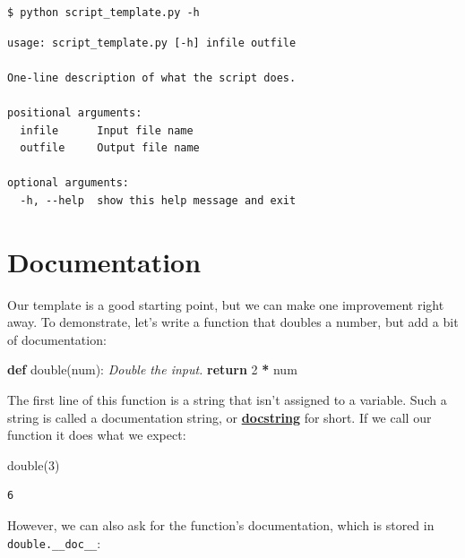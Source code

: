 \documentclass[
]{krantz}
\makeatletter
\newenvironment{Shaded}{\begin{snugshade}}{\end{snugshade}}
\newcommand{\CommentTok}[1]{\textcolor[rgb]{0.56,0.35,0.01}{\textit{#1}}}
\newcommand{\ControlFlowTok}[1]{\textcolor[rgb]{0.13,0.29,0.53}{\textbf{#1}}}
\newcommand{\DecValTok}[1]{\textcolor[rgb]{0.00,0.00,0.81}{#1}}
\newcommand{\KeywordTok}[1]{\textcolor[rgb]{0.13,0.29,0.53}{\textbf{#1}}}
\newcommand{\NormalTok}[1]{#1}
\newcommand{\OperatorTok}[1]{\textcolor[rgb]{0.81,0.36,0.00}{\textbf{#1}}}
\newenvironment{kframe}{%
\medskip{}
\setlength{\fboxsep}{.8em}
 \def\at@end@of@kframe{}%
 \ifinner\ifhmode%
  \def\at@end@of@kframe{\end{minipage}}%
  \begin{minipage}{\columnwidth}%
 \fi\fi%
 \def\FrameCommand##1{\hskip\@totalleftmargin \hskip-\fboxsep
 \colorbox{shadecolor}{##1}\hskip-\fboxsep
     \hskip-\linewidth \hskip-\@totalleftmargin \hskip\columnwidth}%
 \MakeFramed {\advance\hsize-\width
   \@totalleftmargin\z@ \linewidth\hsize
   \@setminipage}}%
 {\par\unskip\endMakeFramed%
 \at@end@of@kframe}
\renewenvironment{Shaded}{\begin{kframe}}{\end{kframe}}
\newcommand{\gref}[2]{\hyperlink{#2}{\textbf{#1}}}
\makeatother
\begin{document}
\begin{verbatim}
$ python script_template.py -h
\end{verbatim}

\begin{verbatim}
usage: script_template.py [-h] infile outfile

One-line description of what the script does.

positional arguments:
  infile      Input file name
  outfile     Output file name

optional arguments:
  -h, --help  show this help message and exit
\end{verbatim}

\hypertarget{scripting-docstrings}{%
\section{Documentation}\label{scripting-docstrings}}

Our template is a good starting point,
but we can make one improvement right away.
To demonstrate,
let's write a function that doubles a number,
but add a bit of documentation:

\begin{Shaded}
\begin{Highlighting}[]
\KeywordTok{def}\NormalTok{ double(num):}
    \CommentTok{\textquotesingle{}Double the input.\textquotesingle{}}
    \ControlFlowTok{return} \DecValTok{2} \OperatorTok{*}\NormalTok{ num}
\end{Highlighting}
\end{Shaded}

The first line of this function is a string
that isn't assigned to a variable.
Such a string is called a documentation string,
or \gref{docstring}{docstring} for short.
If we call our function it does what we expect:

\begin{Shaded}
\begin{Highlighting}[]
\NormalTok{double(}\DecValTok{3}\NormalTok{)}
\end{Highlighting}
\end{Shaded}

\begin{verbatim}
6
\end{verbatim}

However,
we can also ask for the function's documentation,
which is stored in \texttt{double.\_\_doc\_\_}:
\end{document}
